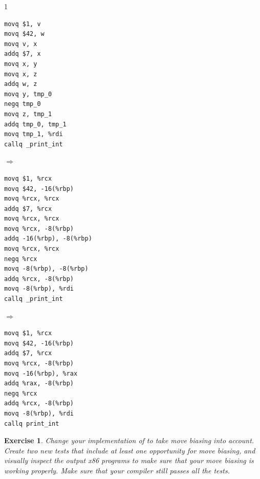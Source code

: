 \documentclass[7x10]{TimesAPriori_MIT}%
\def\pythonEd{1}
\def\edition{1}
\newcommand{\pythonColor}[0]{}
\newtheorem{exercise}[theorem]{Exercise}
\numberwithin{theorem}{chapter}
\numberwithin{definition}{chapter}
\numberwithin{equation}{chapter}
\begin{document}
{\if\edition\pythonEd\pythonColor
\begin{center}
\begin{minipage}{0.20\textwidth}
\begin{lstlisting}[basicstyle=\ttfamily\footnotesize]
movq $1, v
movq $42, w
movq v, x
addq $7, x
movq x, y
movq x, z
addq w, z
movq y, tmp_0
negq tmp_0
movq z, tmp_1
addq tmp_0, tmp_1
movq tmp_1, %rdi
callq _print_int
\end{lstlisting}
\end{minipage}
${\Rightarrow\qquad}$
\begin{minipage}{0.35\textwidth}
\begin{lstlisting}[basicstyle=\ttfamily\footnotesize]
movq $1, %rcx
movq $42, -16(%rbp)
movq %rcx, %rcx
addq $7, %rcx
movq %rcx, %rcx
movq %rcx, -8(%rbp)
addq -16(%rbp), -8(%rbp)
movq %rcx, %rcx
negq %rcx
movq -8(%rbp), -8(%rbp)
addq %rcx, -8(%rbp)
movq -8(%rbp), %rdi
callq _print_int
\end{lstlisting}
\end{minipage}
${\Rightarrow\qquad}$
\begin{minipage}{0.20\textwidth}
\begin{lstlisting}[basicstyle=\ttfamily\footnotesize]
movq $1, %rcx
movq $42, -16(%rbp)
addq $7, %rcx
movq %rcx, -8(%rbp)
movq -16(%rbp), %rax
addq %rax, -8(%rbp)
negq %rcx
addq %rcx, -8(%rbp)
movq -8(%rbp), %rdi
callq print_int
\end{lstlisting}
\end{minipage}
\end{center}
\fi}

\begin{exercise}\normalfont\normalsize
Change your implementation of  to take move
biasing into account. Create two new tests that include at least one
opportunity for move biasing, and visually inspect the output x86
programs to make sure that your move biasing is working properly. Make
sure that your compiler still passes all the tests.
\end{exercise}


\end{document}
